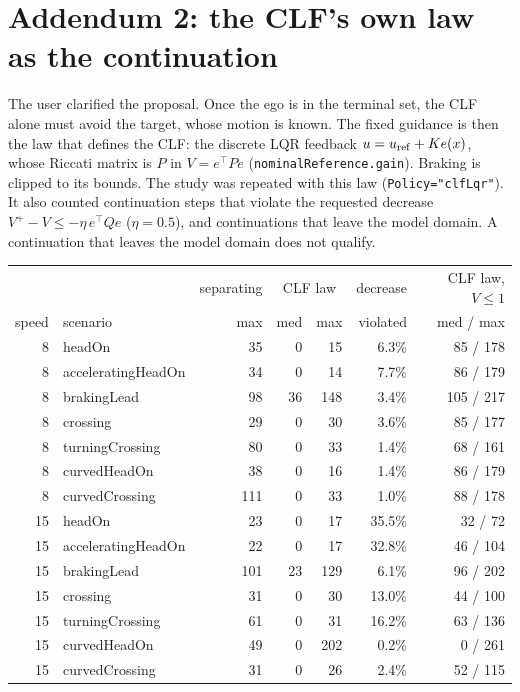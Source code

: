 \documentclass[11pt]{article}
\begin{document}
\section{Addendum 2: the CLF's own law as the continuation}
The user clarified the proposal. Once the ego is in the terminal set, the CLF
alone must avoid the target, whose motion is known. The fixed guidance is then
the law that defines the CLF: the discrete LQR feedback
$u=u_{\rm ref}+Ke(x)$, whose Riccati matrix is $P$ in $V=e^\top Pe$
(\texttt{nominalReference.gain}). Braking is clipped to its bounds. The study
was repeated with this law (\texttt{Policy="clfLqr"}). It also counted
continuation steps that violate the requested decrease
$V^+-V\le-\eta\,e^\top Qe$ ($\eta=0.5$), and continuations that leave the model
domain. A continuation that leaves the model domain does not qualify.

\begin{center}
\begin{tabular}{rlrrrrr}
\toprule
 & & separating & \multicolumn{2}{c}{CLF law} & decrease & CLF law, $V\le1$\\
speed & scenario & max & med & max & violated & med / max\\
\midrule
8 & headOn & 35 & 0 & 15 & 6.3\% & 85 / 178\\
8 & acceleratingHeadOn & 34 & 0 & 14 & 7.7\% & 86 / 179\\
8 & brakingLead & 98 & 36 & 148 & 3.4\% & 105 / 217\\
8 & crossing & 29 & 0 & 30 & 3.6\% & 85 / 177\\
8 & turningCrossing & 80 & 0 & 33 & 1.4\% & 68 / 161\\
8 & curvedHeadOn & 38 & 0 & 16 & 1.4\% & 86 / 179\\
8 & curvedCrossing & 111 & 0 & 33 & 1.0\% & 88 / 178\\
15 & headOn & 23 & 0 & 17 & 35.5\% & 32 / 72\\
15 & acceleratingHeadOn & 22 & 0 & 17 & 32.8\% & 46 / 104\\
15 & brakingLead & 101 & 23 & 129 & 6.1\% & 96 / 202\\
15 & crossing & 31 & 0 & 30 & 13.0\% & 44 / 100\\
15 & turningCrossing & 61 & 0 & 31 & 16.2\% & 63 / 136\\
15 & curvedHeadOn & 49 & 0 & 202 & 0.2\% & 0 / 261\\
15 & curvedCrossing & 31 & 0 & 26 & 2.4\% & 52 / 115\\
\bottomrule
\end{tabular}
\end{center}
\end{document}
